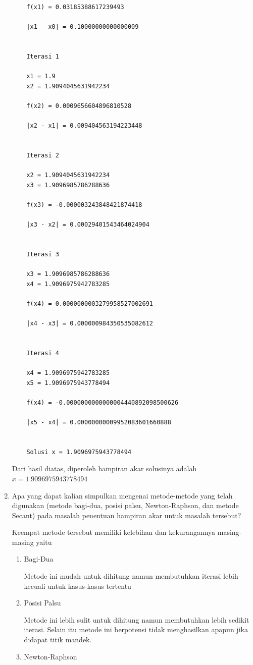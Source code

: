 \documentclass[12pt]{article}
\begin{document}
\begin{enumerate}
{\begin{lstlisting}
    f(x1) = 0.03185388617239493
    
    |x1 - x0| = 0.10000000000000009
    
    
    Iterasi 1
    
    x1 = 1.9
    x2 = 1.9094045631942234
    
    f(x2) = 0.0009656604896810528
    
    |x2 - x1| = 0.009404563194223448
    
    
    Iterasi 2
    
    x2 = 1.9094045631942234
    x3 = 1.9096985786288636
    
    f(x3) = -0.000003243848421874418
    
    |x3 - x2| = 0.00029401543464024904
    
    
    Iterasi 3
    
    x3 = 1.9096985786288636
    x4 = 1.9096975942783285
    
    f(x4) = 0.0000000003279958527002691
    
    |x4 - x3| = 0.000000984350535082612
    
    
    Iterasi 4
    
    x4 = 1.9096975942783285
    x5 = 1.9096975943778494
    
    f(x4) = -0.0000000000000004440892098500626
    
    |x5 - x4| = 0.00000000009952083601660888
    
    
    Solusi x = 1.9096975943778494
        \end{lstlisting}
        Dari hasil diatas, diperoleh hampiran akar solusinya adalah $ x = 1.9096975943778494 $
    } \bigskip
    \item {
        Apa yang dapat kalian simpulkan mengenai metode-metode yang telah digunakan (metode bagi-dua, posisi palsu, Newton-Raphson, dan metode Secant) pada masalah penentuan hampiran akar untuk masalah tersebut? \bigskip

        Keempat metode tersebut memiliki kelebihan dan kekurangannya masing-masing yaitu
        \begin{enumerate}
            \item {
                Bagi-Dua \bigskip

                Metode ini mudah untuk dihitung namun membutuhkan iterasi lebih kecuali untuk kasus-kasus tertentu \bigskip
            }
            \item {
                Posisi Palsu \bigskip

                Metode ini lebih sulit untuk dihitung namun membutuhkan lebih sedikit iterasi. Selain itu metode ini berpotensi tidak menghasilkan apapun jika didapat titik mandek. \bigskip
            }
            \item {
                Newton-Raphson \bigskip

}
\end{enumerate}}
\end{enumerate}
\end{document}

